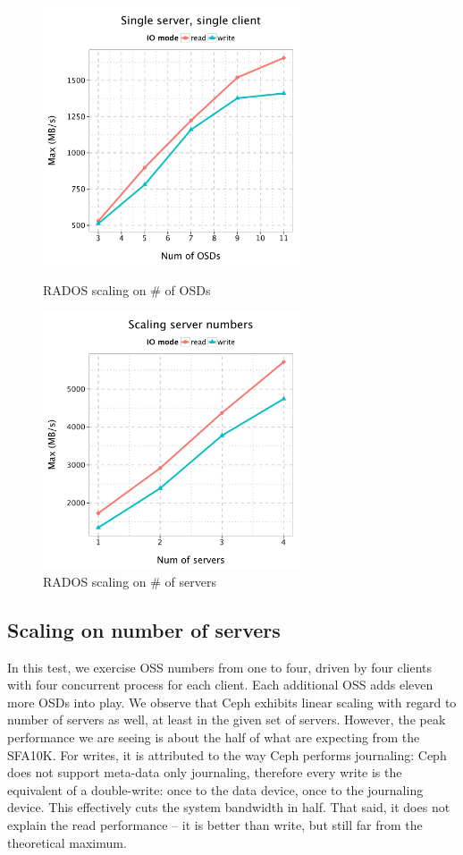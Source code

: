 \documentclass{article}
\begin{document}
\begin{figure}[H]
\centering
\begin{minipage}[t]{0.5\linewidth}
\centering
\includegraphics[width=3in]{data/rados_osd}
\caption{RADOS scaling on \# of OSDs}
\label{fig:osd-scale}
\end{minipage}%
\begin{minipage}[t]{0.5\linewidth}
\centering
\includegraphics[width=3in]{data/rados_server}
\caption{RADOS scaling on \# of servers}
\label{fig:oss-scale}
\end{minipage}%
\end{figure}

\subsection{Scaling on number of servers}

In this test, we exercise OSS numbers from one to four, driven by four clients with four
concurrent process for each client. Each additional OSS adds eleven more OSDs into
play. We observe that Ceph exhibits linear scaling with regard to
number of servers as well, at least in the given set of servers. However, the peak
performance we are seeing is about the half of what are expecting from the SFA10K.
For writes, it is attributed to the way Ceph performs
journaling: Ceph does not support meta-data only journaling, therefore every
write is the equivalent of a double-write: once to the data device, once to the
journaling device. This effectively cuts the system bandwidth in half. That said,
it does not explain the read performance -- it is better than write, but 
still far from the theoretical maximum.
\end{document}
